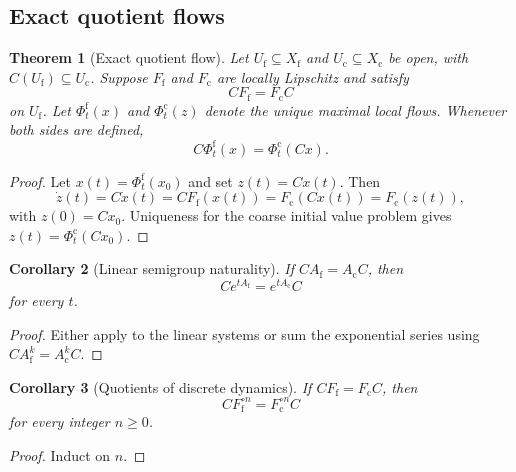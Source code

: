 \documentclass[11pt]{article}
\newtheorem{theorem}{Theorem}[section]
\newtheorem{corollary}[theorem]{Corollary}
\theoremstyle{definition}
\theoremstyle{remark}
\newcommand{\fine}{\mathrm f}
\newcommand{\coarse}{\mathrm c}
\begin{document}
\subsection{Exact quotient flows}

\begin{theorem}[Exact quotient flow]\label{thm:exact-quotient-flow}
Let $U_{\fine}\subseteq X_{\fine}$ and $U_{\coarse}\subseteq X_{\coarse}$ be open, with $C(U_{\fine})\subseteq U_{\coarse}$.  Suppose $F_{\fine}$ and $F_{\coarse}$ are locally Lipschitz and satisfy
\[
  CF_{\fine}=F_{\coarse}C
\]
on $U_{\fine}$.  Let $\Phi_t^{\fine}(x)$ and $\Phi_t^{\coarse}(z)$ denote the unique maximal local flows.  Whenever both sides are defined,
\begin{equation}\label{eq:exact-flow-identity}
  \boxed{
  C\Phi_t^{\fine}(x)
  =
  \Phi_t^{\coarse}(Cx).}
\end{equation}
\end{theorem}

\begin{proof}
Let $x(t)=\Phi_t^{\fine}(x_0)$ and set $z(t)=Cx(t)$.  Then
\[
  \dot z(t)
  =C\dot x(t)
  =CF_{\fine}(x(t))
  =F_{\coarse}(Cx(t))
  =F_{\coarse}(z(t)),
\]
with $z(0)=Cx_0$.  Uniqueness for the coarse initial value problem gives $z(t)=\Phi_t^{\coarse}(Cx_0)$.
\end{proof}

\begin{corollary}[Linear semigroup naturality]\label{cor:linear-semigroup-naturality}
If $CA_{\fine}=A_{\coarse}C$, then
\begin{equation}\label{eq:linear-semigroup-naturality}
  Ce^{tA_{\fine}}
  =
  e^{tA_{\coarse}}C
\end{equation}
for every $t$.
\end{corollary}

\begin{proof}
Either apply  to the linear systems or sum the exponential series using $CA_{\fine}^k=A_{\coarse}^kC$.
\end{proof}

\begin{corollary}[Quotients of discrete dynamics]\label{cor:discrete-quotient}
If $CF_{\fine}=F_{\coarse}C$, then
\[
  CF_{\fine}^{\circ n}
  =
  F_{\coarse}^{\circ n}C
\]
for every integer $n\geq0$.
\end{corollary}

\begin{proof}
Induct on $n$.
\end{proof}
\end{document}
